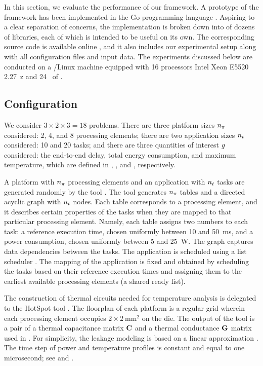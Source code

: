 In this section, we evaluate the performance of our framework. A prototype of
the framework has been implemented in the Go programming language \cite{go}.
Aspiring to a clear separation of concerns, the implementation is broken down
into of dozens of libraries, each of which is intended to be useful on its own.
The corresponding source code is available online \cite{sources}, and it also
includes our experimental setup along with all configuration files and input
data. The experiments discussed below are conducted on a /Linux machine
equipped with 16 processors Intel Xeon E5520 2.27~z and 24~ of
.

\subsection{Configuration}

We consider $3 \times 2 \times 3 = 18$ problems. There are three platform sizes
${n_\pi}$ considered: 2, 4, and 8 processing elements; there are two application
sizes ${n_t}$ considered: 10 and 20 tasks; and there are three quantities of
interest $g$ considered: the end-to-end delay, total energy consumption, and
maximum temperature, which are defined in ,
, and , respectively.

A platform with ${n_\pi}$ processing elements and an application with ${n_t}$ tasks
are generated randomly by the  tool \cite{dick1998}. The tool generates
${n_\pi}$ tables and a directed acyclic graph with ${n_t}$ nodes. Each table
corresponds to a processing element, and it describes certain properties of the
tasks when they are mapped to that particular processing element. Namely, each
table assigns two numbers to each task: a reference execution time, chosen
uniformly between 10 and 50~ms, and a power consumption, chosen uniformly
between 5 and 25~W. The graph captures data dependencies between the tasks. The
application is scheduled using a list scheduler \cite{adam1974}. The mapping of
the application is fixed and obtained by scheduling the tasks based on their
reference execution times and assigning them to the earliest available
processing elements (a shared ready list).

The construction of thermal  circuits needed for temperature analysis is
delegated to the HotSpot tool \cite{skadron2004}. The floorplan of each platform
is a regular grid wherein each processing element occupies $2 \times
2~\text{mm}^2$ on the die. The output of the tool is a pair of a thermal
capacitance matrix $\mathbf{C}$ and a thermal conductance $\mathbf{G}$ matrix used in
. For simplicity, the leakage modeling is based on a linear
approximation \cite{yang2013, ukhov2012, liu2007}. The time step of power and
temperature profiles is constant and equal to one microsecond; see 
and .

